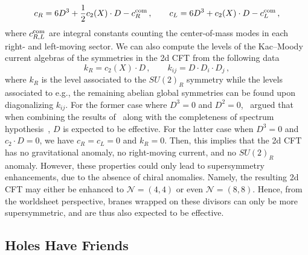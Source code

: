 \documentclass[11pt,dvipsnames]{article}
\theoremstyle{definition}
\newcommand{\cN}{\mathcal{N}}
\begin{document}
\begin{equation}
    c_R=6D^3+\frac12 c_2(X) \cdot D - c_R^{\rm com}\,,\qquad c_L=6D^3+c_2(X) \cdot D-c_L^{\rm com}\,,
\end{equation}
where $c_{R,L}^{\rm com}$ are integral constants counting the center-of-mass modes in each right- and left-moving sector. We can also compute the levels of the Kac--Moody current algebras of the symmetries in the 2d CFT from the following data
\begin{equation}
    k_R=c_2(X) \cdot D\,,\qquad k_{ij} =D \cdot D_i \cdot D_j\,,
\end{equation}
where $k_R$ is the level associated to the $SU(2)_R$ symmetry while the levels associated to e.g., the remaining abelian global symmetries can be found upon diagonalizing $k_{ij}$. For the former case where $D^3=0$ and $D^2=0$,~\cite{Katz:2020ewz} argued that when combining the results of~\cite{Oguiso} along with the completeness of spectrum hypothesis~\cite{Polchinski:2003bq,Banks:2010zn}, $D$ is expected to be effective. For the latter case when $D^3=0$ and $c_2 \cdot D=0$, we have $c_R=c_L=0$ and $k_R=0$. Then, this implies that the 2d CFT has no gravitational anomaly, no right-moving current, and no $SU(2)_R$ anomaly. However, these properties could only lead to supersymmetry enhancements, due to the absence of chiral anomalies. Namely, the resulting 2d CFT may either be enhanced to $\cN=(4,4)$ or even $\cN=(8,8)$.
Hence, from the worldsheet perspective, branes wrapped on these divisors can only be more supersymmetric, and are thus also expected to be effective. 

\subsection{Holes Have Friends}
\label{sec:friends}
\end{document}
